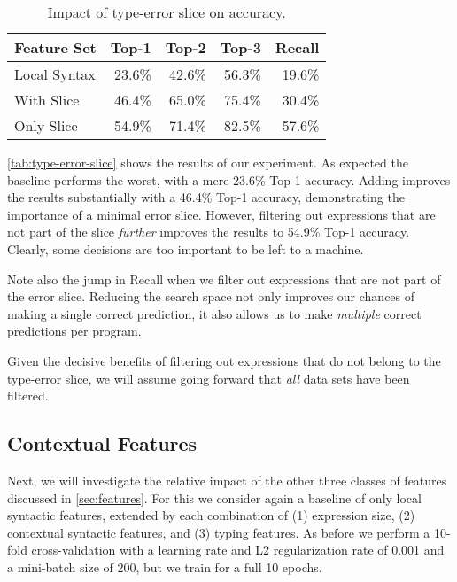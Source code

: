 \begin{table}[ht]
  \centering
  \begin{tabular}{lrrrr}
    \toprule
    Feature Set  & Top-1  & Top-2  & Top-3  & Recall \\
    \midrule
    Local Syntax & 23.6\% & 42.6\% & 56.3\% & 19.6\% \\
    With Slice   & 46.4\% & 65.0\% & 75.4\% & 30.4\% \\
    Only Slice   & 54.9\% & 71.4\% & 82.5\% & 57.6\% \\
    \bottomrule
  \end{tabular}
  \caption{
    Impact of type-error slice on accuracy.
  }\label{tab:type-error-slice}
\end{table}

\autoref{tab:type-error-slice} shows the results of our experiment.
%
As expected the baseline performs the worst, with a mere 23.6\% Top-1
accuracy.
%
Adding \InSlice improves the results substantially with a 46.4\% Top-1
accuracy, demonstrating the importance of a minimal error slice.
%
However, filtering out expressions that are not part of the slice
\emph{further} improves the results to 54.9\% Top-1 accuracy.
%
Clearly, some decisions are too important to be left to a machine.

Note also the jump in Recall when we filter out expressions that are not
part of the error slice.
%
Reducing the search space not only improves our chances of making a
single correct prediction, it also allows us to make \emph{multiple}
correct predictions per program.

Given the decisive benefits of filtering out expressions that do not
belong to the type-error slice, we will assume going forward that
\emph{all} data sets have been filtered.

\subsection{Contextual Features}
\label{sec:contextual-features}

Next, we will investigate the relative impact of the other three classes
of features discussed in \autoref{sec:features}.
%
For this we consider again a baseline of only local syntactic features,
extended by each combination of
%
(1) expression size,
(2) contextual syntactic features, and
(3) typing features.
%
As before we perform a 10-fold cross-validation with a learning rate and
L2 regularization rate of 0.001 and a mini-batch size of 200, but we
train for a full 10 epochs.

